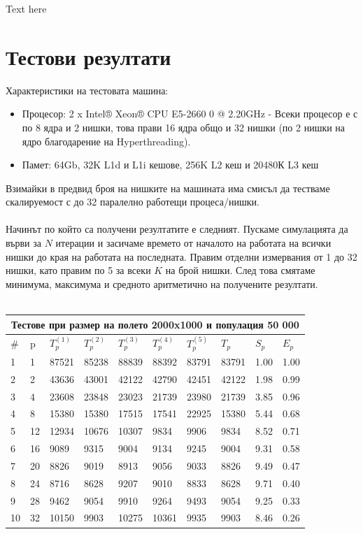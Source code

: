 \documentclass{article}
\begin{document}
\vfill

\hspace{0pt}


\newpage
Text here
\newpage

\section{Тестови резултати}

Характеристики на тестовата машина: 
\begin{itemize}
	\item Процесор: 2 x Intel® Xeon® CPU E5-2660 0 @ 2.20GHz - Всеки процесор е с по 8 ядра и 2 нишки,
	това прави 16 ядра общо и 32 нишки (по 2 нишки на ядро благодарение на Hyperthreading).
	\item Памет: 64Gb, 32K L1d и L1i кешове, 256K L2 кеш и 20480К L3 кеш
\end{itemize}
Взимайки в предвид броя на нишките на машината има смисъл да тестваме скалируемост с до 32 паралелно работещи процеса/нишки.
\\
\\
Начинът по който са получени резултатите е следният. Пускаме симулацията да върви за $N$ итерации
и засичаме времето от началото на работата на всички нишки до края на работата на последната.
Правим отделни измервания от 1 до 32 нишки, като правим по 5 за всеки $K$ на брой нишки. След това
смятаме минимума, максимума и средното аритметично на получените резултати.
\\
\\
\begin{tabular}{ |p{0.6cm}||p{0.8cm}|p{0.8cm}|p{0.8cm}|p{0.8cm}|p{0.8cm}|p{0.8cm}|p{0.8cm}|p{0.8cm}|p{0.8cm}| }
 \hline
 \multicolumn{10}{|c|}{Тестове при размер на полето 2000x1000 и популация 50 000} \\
 \hline
 \# & p & $T^{(1)}_p$ & $T^{(2)}_p$ & $T^{(3)}_p$ & $T^{(4)}_p$ & $T^{(5)}_p$ & $T_p$ & $S_p$ & $E_p$ \\
 \hline
1  & 1  & 87521 & 85238 & 88839 & 88392 & 83791 & 83791 & 1.00 & 1.00 \\
2  & 2  & 43636 &  43001 & 42122 & 42790 & 42451 & 42122 & 1.98 & 0.99 \\
3  & 4  & 23608 & 23848 & 23023 & 21739 & 23980 & 21739 & 3.85 & 0.96 \\
4  & 8  & 15380 & 15380 & 17515 & 17541 & 22925 & 15380 & 5.44 & 0.68 \\
5  & 12 & 12934 & 10676 & 10307 & 9834 & 9906 & 9834 & 8.52 & 0.71 \\
6  & 16 & 9089 & 9315 & 9004 & 9134 & 9245 & 9004 & 9.31 & 0.58 \\
7  & 20 & 8826 & 9019 & 8913 & 9056 & 9033 & 8826 & 9.49 & 0.47 \\
8  & 24 & 8716 & 8628 & 9207 & 9010 & 8833 & 8628 & 9.71 & 0.40 \\
9  & 28 & 9462 & 9054 & 9910 & 9264 & 9493 & 9054 & 9.25 & 0.33 \\
10 & 32 & 10150 & 9903 & 10275 & 10361 & 9935 & 9903 & 8.46 & 0.26 \\
 \hline
\end{tabular}
\end{document}
